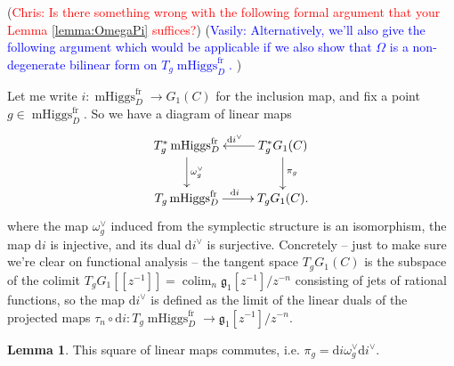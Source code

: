 \documentclass[11pt, oneside, reqno]{amsart}
\theoremstyle{definition} \newtheorem{definition}{Definition}[section]
\newtheorem{lemma}[definition]{Lemma}
\theoremstyle{definition} \newtheorem{remark}[definition]{Remark}
\theoremstyle{definition} \newtheorem{remarks}[definition]{Remarks}
\theoremstyle{definition} \newtheorem{question}[definition]{Question}
\theoremstyle{definition} \newtheorem*{note}{Note}
\theoremstyle{definition} \newtheorem{example}[definition]{Example}
\theoremstyle{definition} \newtheorem{examples}[definition]{Examples}
\renewcommand{\gg}{\mathfrak{g}}
\DeclareMathOperator{\mhiggs}{mHiggs}
\DeclareMathOperator{\colim}{colim}
\renewcommand{\d}{\mathrm{d}}
\newcommand{\fr}{\mathrm{fr}}
\newcommand{\chris}[1]{(\textcolor{red}{Chris: #1})}
\newcommand{\vasily}[1]{(\textcolor{blue}{Vasily: #1})}
\begin{document}
 
\chris{Is there something wrong with the following formal argument that your Lemma \ref{lemma:OmegaPi} suffices?}
\vasily{Alternatively, we'll also give the following argument which
  would be applicable if we also show that $\Omega$
  is a non-degenerate  bilinear form on $T_{g} \mhiggs^{\fr}_{D}$. }


Let me write $i \colon \mhiggs^\fr_D \to G_1(C)$ for the inclusion map, and fix a point $g \in \mhiggs^\fr_D$.  So we have a diagram of linear maps
\[\xymatrix{
T^*_g \mhiggs^\fr_D \ar[d]^{\omega^\vee_g} &T^*_g {G_1(C)} \ar[d]^{\pi_g} \ar[l]_{\d i^\vee} \\
T_g \mhiggs^\fr_D \ar[r]^{\d i} &T_g {G_1(C)}. 
}\]
where the map $\omega^\vee_g$ induced from the symplectic structure is an isomorphism, the map $\d i$ is injective, and its dual $\d i^\vee$ is surjective.  Concretely -- just to make sure we're clear on functional analysis -- the tangent space $T_g {G_1(C)}$ is the subspace of the colimit $T_g G_1[[z^{-1}]] = \colim_n \gg_1[z^{-1}]/z^{-n}$ consisting of jets of rational functions, so the map $\d i^\vee$ is defined as the limit of the linear duals of the projected maps $\tau_n \circ \d i \colon T_g \mhiggs^\fr_D \to \gg_1[z^{-1}]/z^{-n}$.



\begin{lemma} \label{commuting_diagram_lemma}
This square of linear maps commutes, i.e. $\pi_g = \d i \omega^\vee_g \d i^\vee$.
\end{lemma}
\end{document}
